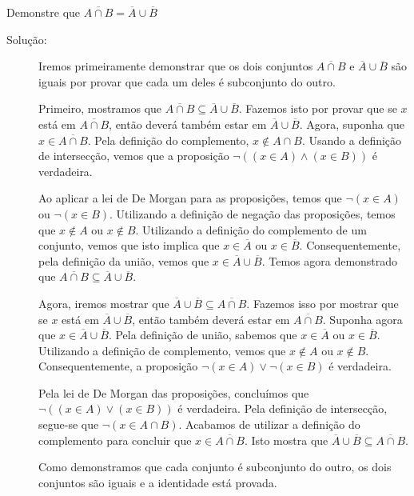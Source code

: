 \begin{exmp}
\label{exem321}
Demonstre que $\overline{A \cap B} = \overline{A} \cup \overline{B}$
\begin{description}
\item[Solução:] Iremos primeiramente demonstrar que os dois conjuntos
$\overline{A \cap B}$ e $\overline{A} \cup \overline{B}$ são iguais por provar
que cada um deles é subconjunto do outro. 

Primeiro, mostramos que $\overline{A \cap B} \subseteq \overline{A} \cup
\overline{B}$. Fazemos isto por provar que se $x$ está em $\overline{A \cap B}$,
então deverá também estar em $\overline{A} \cup \overline{B}$. Agora, suponha
que $x \in \overline{A \cap B}$. Pela definição do complemento, $x \notin A
\cap B$. Usando a definição de intersecção, vemos que a proposição $\lnot ((x
\in A) \land (x \in B))$ é verdadeira.

Ao aplicar a lei de De Morgan para as proposições, temos que $\lnot(x \in A)$ ou
$\lnot(x \in B)$. Utilizando a definição de negação das proposições, temos que
$x \notin A$ ou $x \notin B$. Utilizando a definição do complemento de um
conjunto, vemos que isto implica que $x \in \overline{A}$ ou $x \in
\overline{B}$. Consequentemente, pela definição da união, vemos que $x \in
\overline{A} \cup \overline{B}$. Temos agora demonstrado que $\overline{A
\cap B} \subseteq \overline{A} \cup \overline{B}$.

Agora, iremos mostrar que $\overline{A} \cup \overline{B} \subseteq
\overline{A \cap B}$. Fazemos isso por mostrar que se $x$ está em $\overline{A}
\cup \overline{B}$, então também deverá estar em $\overline{A \cap B}$. Suponha
agora que $x \in \overline{A} \cup \overline{B}$. Pela definição de união,
sabemos que $x \in \overline{A}$ ou $x \in \overline{B}$. Utilizando a definição
de complemento, vemos que $x \notin A$ ou $x \notin B$. Consequentemente, a
proposição $\lnot (x \in A) \lor \lnot (x \in B)$ é verdadeira.

Pela lei de De Morgan das proposições, concluímos que $\lnot ((x \in A) \lor
(x \in B))$ é verdadeira. Pela definição de intersecção, segue-se que $\lnot
(x \in A \cap B)$. Acabamos de utilizar a definição do complemento para concluir
que $x \in \overline{A \cap B}$. Isto mostra que $\overline{A} \cup
\overline{B} \subseteq \overline{A \cap B}$.

Como demonstramos que cada conjunto é subconjunto do outro, os dois conjuntos
são iguais e a identidade está provada.
\end{description}
\end{exmp}

